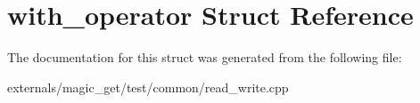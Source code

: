 \hypertarget{structwith__operator}{}\section{with\+\_\+operator Struct Reference}
\label{structwith__operator}


The documentation for this struct was generated from the following file\+:\begin{DoxyCompactItemize}
\item 
externals/magic\+\_\+get/test/common/read\+\_\+write.\+cpp\end{DoxyCompactItemize}
